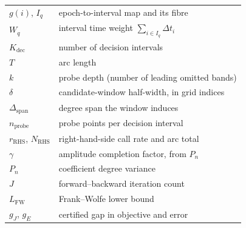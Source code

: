 \begin{minipage}[t]{0.48\textwidth}
\begin{tabular}{@{}l@{\ \ }l@{}}
$g(i)$, $I_q$ & epoch-to-interval map and its fibre \\
$W_q$ & interval time weight $\sum_{i\in I_q}\Delta t_i$ \\
$K_{\mathrm{dec}}$ & number of decision intervals \\
$T$ & arc length \\
$k$ & probe depth (number of leading omitted bands) \\
$\delta$ & candidate-window half-width, in grid indices \\
$\Delta_{\mathrm{span}}$ & degree span the window induces \\
$n_{\mathrm{probe}}$ & probe points per decision interval \\
$r_{\mathrm{RHS}}$, $N_{\mathrm{RHS}}$ & right-hand-side call rate and arc total \\
$\gamma$ & amplitude completion factor, from $P_n$ \\
$P_n$ & coefficient degree variance \\
$J$ & forward--backward iteration count \\
$L_{\mathrm{FW}}$ & Frank--Wolfe lower bound \\
$g_J$, $g_E$ & certified gap in objective and error \\
\end{tabular}
\end{minipage}
\hfill
